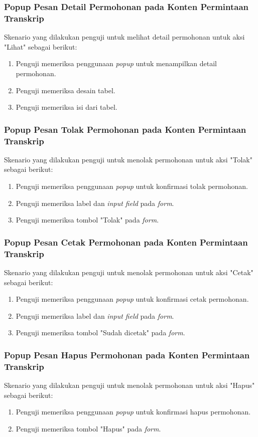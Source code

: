 \subsubsection{Popup Pesan Detail Permohonan pada Konten Permintaan Transkrip}
Skenario yang dilakukan penguji untuk melihat detail permohonan untuk aksi "Lihat" sebagai berikut:
\begin{enumerate}
	\item Penguji memeriksa penggunaan \textit{popup} untuk menampilkan detail permohonan.
	\item Penguji memeriksa desain tabel.	
	\item Penguji memeriksa isi dari tabel.
\end{enumerate}

\subsubsection{Popup Pesan Tolak Permohonan pada Konten Permintaan Transkrip}
Skenario yang dilakukan penguji untuk menolak permohonan untuk aksi "Tolak" sebagai berikut:
\begin{enumerate}
	\item Penguji memeriksa penggunaan \textit{popup} untuk konfirmasi tolak permohonan.
	\item Penguji memeriksa label dan \textit{input field} pada \textit{form}.
	\item Penguji memeriksa tombol "Tolak" pada \textit{form}.	
\end{enumerate}

\subsubsection{Popup Pesan Cetak Permohonan pada Konten Permintaan Transkrip}
Skenario yang dilakukan penguji untuk menolak permohonan untuk aksi "Cetak" sebagai berikut:
\begin{enumerate}
	\item Penguji memeriksa penggunaan \textit{popup} untuk konfirmasi cetak permohonan.
	\item Penguji memeriksa label dan \textit{input field} pada \textit{form}.
	\item Penguji memeriksa tombol "Sudah dicetak" pada \textit{form}.	
\end{enumerate}

\subsubsection{Popup Pesan Hapus Permohonan pada Konten Permintaan Transkrip}
Skenario yang dilakukan penguji untuk menolak permohonan untuk aksi "Hapus" sebagai berikut:
\begin{enumerate}
	\item Penguji memeriksa penggunaan \textit{popup} untuk konfirmasi hapus permohonan.
	\item Penguji memeriksa tombol "Hapus" pada \textit{form}.	
\end{enumerate}

